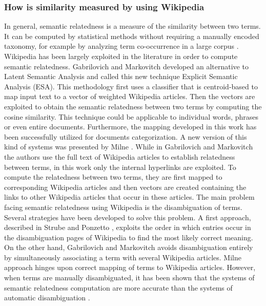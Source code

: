 \documentclass[b5paper,]{book}
\theoremstyle{definition}
\theoremstyle{definition}
\theoremstyle{definition}
\theoremstyle{remark}
\begin{document}
\subsubsection*{How is similarity measured by using
Wikipedia}\label{how-is-similarity-measured-by-using-wikipedia}

In general, semantic relatedness is a measure of the similarity between
two terms. It can be computed by statistical methods without requiring a
manually encoded taxonomy, for example by analyzing term co-occurrence
in a large corpus \citep{resnik1999semantic, jiang1997semantic}.
Wikipedia has been largely exploited in the literature in order to
compute semantic relatedness. Gabrilovich and Markovitch
\citep{gabrilovich2007computing} developed an alternative to Latent
Semantic Analysis and called this new technique Explicit Semantic
Analysis (ESA). This methodology first uses a classifier that is
centroid-based to map input text to a vector of weighted Wikipedia
articles. Then the vectors are exploited to obtain the semantic
relatedness between two terms by computing the cosine similarity. This
technique could be applicable to individual words, phrases or even
entire documents. Furthermore, the mapping developed in this work has
been successfully utilized for documents categorization. A new version
of this kind of systems was presented by Milne
\citep{milne2007computing}. While in Gabrilovich and Markovitch
\citep{gabrilovich2007computing} the authors use the full text of
Wikipedia articles to establish relatedness between terms, in this work
only the internal hyperlinks are exploited. To compute the relatedness
between two terms, they are first mapped to corresponding Wikipedia
articles and then vectors are created containing the links to other
Wikipedia articles that occur in these articles. The main problem facing
semantic relatedness using Wikipedia is the disambiguation of terms.
Several strategies have been developed to solve this problem. A first
approach, described in Strube and Ponzetto \citep{strube2006wikirelate},
exploits the order in which entries occur in the disambiguation pages of
Wikipedia to find the most likely correct meaning. On the other hand,
Gabrilovich and Markovitch \citep{gabrilovich2007computing} avoids
disambiguation entirely by simultaneously associating a term with
several Wikipedia articles. Milne \citep{milne2007computing} approach
hinges upon correct mapping of terms to Wikipedia articles. However,
when terms are manually disambiguated, it has been shown that the
systems of semantic relatedness computation are more accurate than the
systems of automatic disambiguation \citep{medelyan2009mining}.
\end{document}
